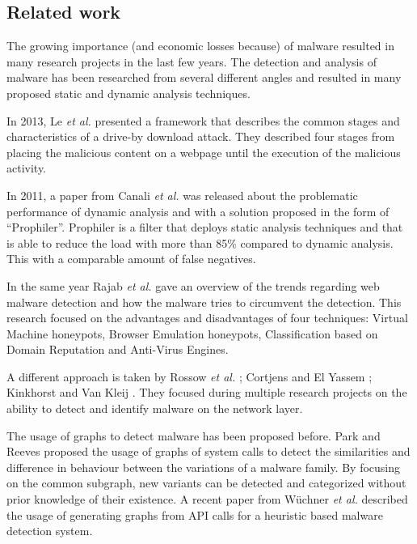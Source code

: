 
\subsection{Related work}

The growing importance (and economic losses because) of malware resulted in many research projects in the last few years. The detection and analysis of malware has been researched from several different angles \cite{auto_malware,Chang2013} and resulted in many proposed static and dynamic analysis techniques.

In 2013, Le \textit{et al.} \cite{Le2013} presented a framework that describes the common stages and characteristics of a drive-by download attack. They described four stages from placing the malicious content on a webpage until the execution of the malicious activity.

In 2011, a paper from Canali \textit{et al.} \cite{Canali2011} was released about the problematic performance of dynamic analysis and with a solution proposed in the form of ``Prophiler''. Prophiler is a filter that deploys static analysis techniques and that is able to reduce the load with more than 85\% compared to dynamic analysis. This with a comparable amount of false negatives.

In the same year Rajab \textit{et al.} \cite{Rajab11trendsin} gave an overview of the trends regarding web malware detection and how the malware tries to circumvent the detection. This research focused on the advantages and disadvantages of four techniques: Virtual Machine honeypots, Browser Emulation honeypots, Classification based on Domain Reputation and Anti-Virus Engines.

A different approach is taken by Rossow \textit{et al.} \cite{Rossow2011}; Cortjens and El Yassem \cite{Cortjens2012}; Kinkhorst and Van Kleij \cite{Kinkhorst2009}. They focused during multiple research projects on the ability to detect and identify malware on the network layer.

The usage of graphs to detect malware has been proposed before. Park and Reeves proposed\cite{Park2011} the usage of graphs of system calls to detect the similarities and difference in behaviour between the variations of a malware family. By focusing on the common subgraph, new variants can be detected and categorized without prior knowledge of their existence. A recent paper\cite{Wuchner2014} from W\"{u}chner \textit{et al.} described the usage of generating graphs from API calls for a heuristic based malware detection system.

